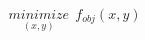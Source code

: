 \documentclass[preview]{standalone}
\begin{document}
\begin{align*}
\underset{(x,y)}{minimize} \ \ f_{obj}(x,y)
\end{align*}
\end{document}
